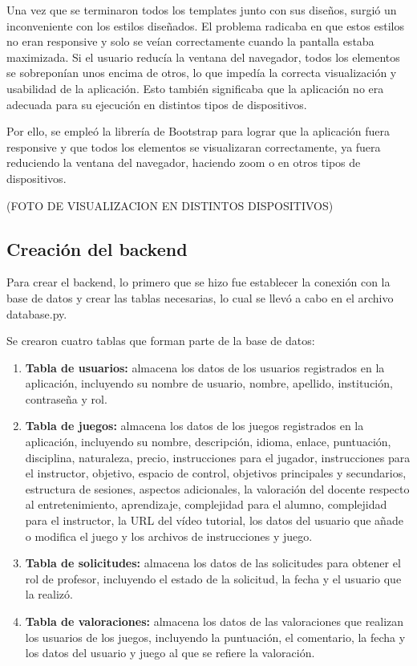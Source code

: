 Una vez que se terminaron todos los templates junto con sus diseños, surgió un inconveniente con los estilos diseñados. El problema radicaba en que estos estilos no eran responsive y solo se veían correctamente cuando la pantalla estaba maximizada. Si el usuario reducía la ventana del navegador, todos los elementos se sobreponían unos encima de otros, lo que impedía la correcta visualización y usabilidad de la aplicación. Esto también significaba que la aplicación no era adecuada para su ejecución en distintos tipos de dispositivos.

Por ello, se empleó la librería de Bootstrap para lograr que la aplicación fuera responsive y que todos los elementos se visualizaran correctamente, ya fuera reduciendo la ventana del navegador, haciendo zoom o en otros tipos de dispositivos.
    
    (FOTO DE VISUALIZACION EN DISTINTOS DISPOSITIVOS)
    
\subsection{Creación del backend}
Para crear el backend, lo primero que se hizo fue establecer la conexión con la base de datos y crear las tablas necesarias, lo cual se llevó a cabo en el archivo database.py. 

Se crearon cuatro tablas que forman parte de la base de datos: 
\begin{enumerate}
    \item \textbf{Tabla de usuarios:} almacena los datos de los usuarios registrados en la aplicación, incluyendo su nombre de usuario, nombre, apellido, institución, contraseña y rol.
    \item \textbf{Tabla de juegos:} almacena los datos de los juegos registrados en la aplicación, incluyendo su nombre, descripción, idioma, enlace, puntuación, disciplina, naturaleza, precio, instrucciones para el jugador, instrucciones para el instructor, objetivo, espacio de control, objetivos principales y secundarios, estructura de sesiones, aspectos adicionales, la valoración del docente respecto al entretenimiento, aprendizaje, complejidad para el alumno, complejidad para el instructor, la URL del vídeo tutorial, los datos del usuario que añade o modifica el juego y los archivos de instrucciones y juego.
    \item \textbf{Tabla de solicitudes:} almacena los datos de las solicitudes para obtener el rol de profesor, incluyendo el estado de la solicitud, la fecha y el usuario que la realizó.
    \item \textbf{Tabla de valoraciones:} almacena los datos de las valoraciones que realizan los usuarios de los juegos, incluyendo la puntuación, el comentario, la fecha y los datos del usuario y juego al que se refiere la valoración.
\end{enumerate}

